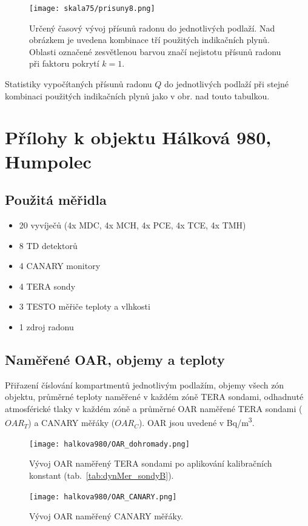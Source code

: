 \begin{figure}[H]
    \centering
    \texttt{[image: skala75/prisuny8.png]}
    \caption{Určený časový vývoj přísunů radonu do jednotlivých podlaží. Nad obrázkem je uvedena kombinace tří použitých indikačních plynů. Oblasti označené zesvětlenou barvou značí nejistotu přísunů radonu při faktoru pokrytí $k=1$.}
    \label{fig:skala75_prisuny8}
\end{figure}
\begin{table}[H]
    \centering
    \caption{Statistiky vypočítaných přísunů radonu $Q$ do jednotlivých podlaží při stejné kombinaci použitých indikačních plynů jako v obr. nad touto tabulkou.}
    \label{tab:skala75_prisuny8}
    
\end{table}

\chapter{Přílohy k objektu Hálková 980, Humpolec}\label{navesti:priloha_halkova980}

\section{Použitá měřidla}

\begin{itemize}
    \setlength\itemsep{0em}
	\item 20 vyvíječů (4x MDC, 4x MCH, 4x PCE, 4x TCE, 4x TMH)
	\item 8 TD detektorů
	\item 4 CANARY monitory
	\item 4 TERA sondy
	\item 3 TESTO měřiče teploty a vlhkosti
	\item 1 zdroj radonu
\end{itemize}

\section{Naměřené OAR, objemy a teploty}

\begin{table}[H]
    \centering
    \caption{Přiřazení číslování kompartmentů jednotlivým podlažím, objemy všech zón objektu, průměrné teploty naměřené v každém zóně TERA sondami, odhadnuté atmosférické tlaky v každém zóně a průměrné OAR naměřené TERA sondami ($OAR_T$) a CANARY měřáky ($OAR_C$). OAR jsou uvedené v \si{Bq/m^3}.}
    \label{tab:halkova980_objemy}
    
\end{table}
\begin{figure}[H]
    \centering
    \texttt{[image: halkova980/OAR\_dohromady.png]}
    \caption{Vývoj OAR naměřený TERA sondami po aplikování kalibračních konstant (tab.~\ref{tab:dynMer_sondyB}).}
    \label{fig:halkova980_OAR_dohromady}
\end{figure}
\begin{figure}[H]
    \centering
    \texttt{[image: halkova980/OAR\_CANARY.png]}
    \caption{Vývoj OAR naměřený CANARY měřáky.}
    \label{fig:halkova980_OAR_CANARY}
\end{figure}

